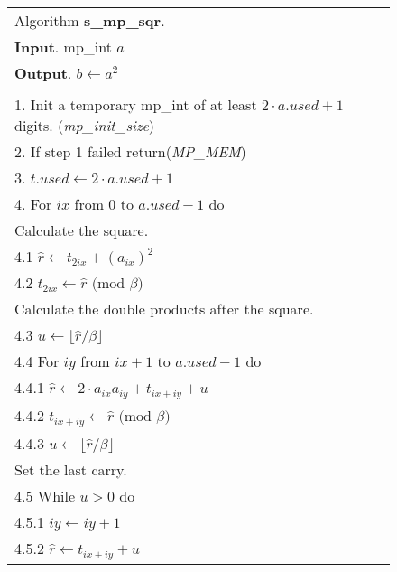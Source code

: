 \documentclass[b5paper]{book}
\begin{document}
\begin{figure}[!here]
\begin{small}
\begin{center}
\begin{tabular}{l}
\hline Algorithm \textbf{s\_mp\_sqr}. \\
\textbf{Input}.   mp\_int $a$ \\
\textbf{Output}.  $b \leftarrow a^2$ \\
\hline \\
1.  Init a temporary mp\_int of at least $2 \cdot a.used +1$ digits.  (\textit{mp\_init\_size}) \\
2.  If step 1 failed return(\textit{MP\_MEM}) \\
3.  $t.used \leftarrow 2 \cdot a.used + 1$ \\
4.  For $ix$ from 0 to $a.used - 1$ do \\
\hspace{3mm}Calculate the square. \\
\hspace{3mm}4.1  $\hat r \leftarrow t_{2ix} + \left (a_{ix} \right )^2$ \\
\hspace{3mm}4.2  $t_{2ix} \leftarrow \hat r \mbox{ (mod }\beta\mbox{)}$ \\
\hspace{3mm}Calculate the double products after the square. \\
\hspace{3mm}4.3  $u \leftarrow \lfloor \hat r / \beta \rfloor$ \\
\hspace{3mm}4.4  For $iy$ from $ix + 1$ to $a.used - 1$ do \\
\hspace{6mm}4.4.1  $\hat r \leftarrow 2 \cdot a_{ix}a_{iy} + t_{ix + iy} + u$ \\
\hspace{6mm}4.4.2  $t_{ix + iy} \leftarrow \hat r \mbox{ (mod }\beta\mbox{)}$ \\
\hspace{6mm}4.4.3  $u \leftarrow \lfloor \hat r / \beta \rfloor$ \\
\hspace{3mm}Set the last carry. \\
\hspace{3mm}4.5  While $u > 0$ do \\
\hspace{6mm}4.5.1  $iy \leftarrow iy + 1$ \\
\hspace{6mm}4.5.2  $\hat r \leftarrow t_{ix + iy} + u$ \\

\end{tabular}
\end{center}
\end{small}
\end{figure}
\end{document}
